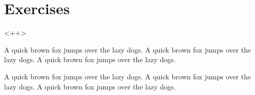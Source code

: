 \section{Exercises}<++>

A quick brown fox jumps over the lazy dogs.
A quick brown fox jumps over the lazy dogs.
A quick brown fox jumps over the lazy dogs.

A quick brown fox jumps over the lazy dogs.
A quick brown fox jumps over the lazy dogs.
A quick brown fox jumps over the lazy dogs.

\newpage{\thispagestyle{empty}\cleardoublepage}

